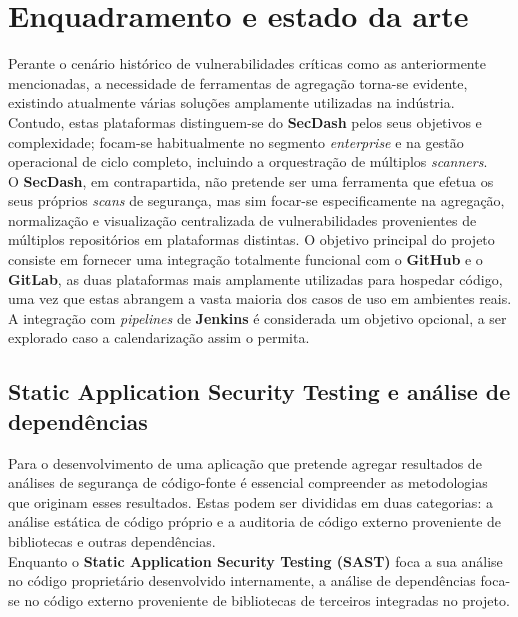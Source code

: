\chapter{Enquadramento e estado da arte} \label{intro:enquadramento}
Perante o cenário histórico de vulnerabilidades críticas como as anteriormente mencionadas, a necessidade de ferramentas de agregação torna-se evidente, existindo atualmente várias soluções amplamente utilizadas na indústria. Contudo, estas plataformas distinguem-se do \textbf{SecDash} pelos seus objetivos e complexidade; focam-se habitualmente no segmento \textit{enterprise} e na gestão operacional de ciclo completo, incluindo a orquestração de múltiplos \textit{scanners}. \\

O \textbf{SecDash}, em contrapartida, não pretende ser uma ferramenta que efetua os seus próprios \textit{scans} de segurança, mas sim focar-se especificamente na agregação, normalização e visualização centralizada de vulnerabilidades provenientes de múltiplos repositórios em plataformas distintas. O objetivo principal do projeto consiste em fornecer uma integração totalmente funcional com o \textbf{GitHub} e o \textbf{GitLab}, as duas plataformas mais amplamente utilizadas para hospedar código, uma vez que estas abrangem a vasta maioria dos casos de uso em ambientes reais. A integração com \textit{pipelines} de \textbf{Jenkins} é considerada um objetivo opcional, a ser explorado caso a calendarização assim o permita. \\

\section{Static Application Security Testing e análise de dependências}
Para o desenvolvimento de uma aplicação que pretende agregar resultados de análises de segurança de código-fonte é essencial compreender as metodologias que originam esses resultados. Estas podem ser divididas em duas categorias: a análise estática de código próprio e a auditoria de código externo proveniente de bibliotecas e outras dependências. \\

Enquanto o \textbf{Static Application Security Testing (SAST)} foca a sua análise no código proprietário desenvolvido internamente, a análise de dependências foca-se no código externo proveniente de bibliotecas de terceiros integradas no projeto. \\


